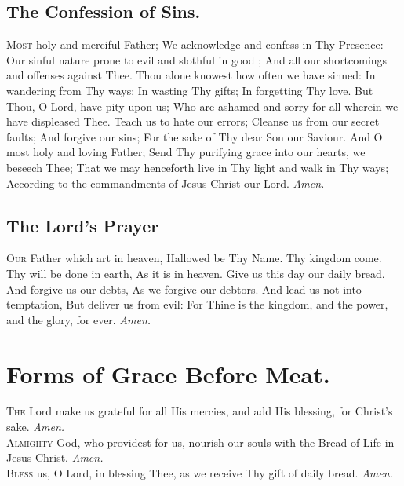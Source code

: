\subsection*{The Confession of Sins.} 

\lettrine{M}{ost} holy and merciful Father; We acknowledge and
confess in Thy Presence: Our sinful nature prone to
evil and slothful in good ; And all our shortcomings and
offenses against Thee. Thou alone knowest how often we
have sinned: In wandering from Thy ways; In wasting
Thy gifts; In forgetting Thy love. But Thou, O Lord,
have pity upon us; Who are ashamed and sorry for all
wherein we have displeased Thee. Teach us to hate our
errors; Cleanse us from our secret faults; And forgive
our sins; For the sake of Thy dear Son our Saviour. And
O most holy and loving Father; Send Thy purifying grace
into our hearts, we beseech Thee; That we may henceforth live in Thy light and walk in Thy ways; According
to the commandments of Jesus Christ our Lord.
\textit{Amen.} \\

\subsection*{The Lord's Prayer}

\lettrine{O}{ur} Father which art in heaven, Hallowed be Thy Name.
Thy kingdom come. Thy will be done in earth, As it
is in heaven. Give us this day our daily bread. And forgive us our debts, As we forgive our debtors. And lead
us not into temptation, But deliver us from evil: For Thine
is the kingdom, and the power, and the glory, for ever.
\textit{Amen.} \\

\section*{Forms of Grace Before Meat.} 

\lettrine{T}{he} Lord make us grateful for all His mercies, and add
His blessing, for Christ’s sake.
\textit{Amen.} \\

\lettrine{A}{lmighty} God, who providest for us, nourish our
souls with the Bread of Life in Jesus Christ.
\textit{Amen.} \\

\lettrine{B}{less} us, O Lord, in blessing Thee, as we receive Thy
gift of daily bread.
\textit{Amen.} \\

